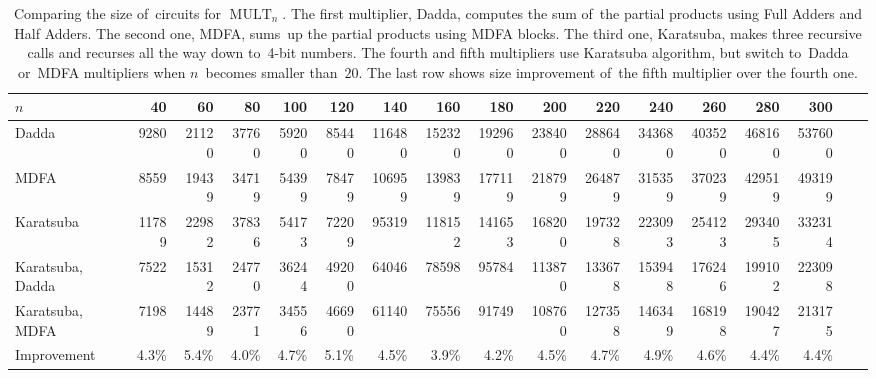 \documentclass[sigconf, review, anonymous]{acmart}
\DeclareMathOperator{\MULT}{MULT}
\begin{document}
\begin{table}
	\begin{center}
		\small
		\begin{tabular}{lrrrrrrrrrrrrrrrr}
\toprule
$n$ & 40 & 60 & 80 & 100 & 120 & 140 & 160 & 180 & 200 & 220 & 240 & 260 & 280 & 300 \\
\midrule
Dadda & 9280 & 21120 & 37760 & 59200 & 85440 & 116480 & 152320 & 192960 & 238400 & 288640 & 343680 & 403520 & 468160 & 537600 \\
MDFA & 8559 & 19439 & 34719 & 54399 & 78479 & 106959 & 139839 & 177119 & 218799 & 264879 & 315359 & 370239 & 429519 & 493199 \\
Karatsuba & 11789 & 22982 & 37836 & 54173 & 72209 & 95319 & 118152 & 141653 & 168200 & 197328 & 223093 & 254123 & 293405 & 332314 \\
Karatsuba, Dadda& 7522 & 15312 & 24770 & 36244 & 49200 & 64046 & 78598 & 95784 & 113870 & 133678 & 153948 & 176246 & 199102 & 223098 \\
Karatsuba, MDFA& 7198 & 14489 & 23771 & 34556 & 46690 & 61140 & 75556 & 91749 & 108760 & 127358 & 146349 & 168198 & 190427 & 213175 \\
Improvement  & 4.3\%  & 5.4\%  & 4.0\%  & 4.7\%  & 5.1\%  & 4.5\%  & 3.9\%  & 4.2\%  & 4.5\%  & 4.7\%  & 4.9\%  & 4.6\%  & 4.4\%  & 4.4\%\\ \bottomrule
		\end{tabular}
	\end{center}
	\caption{Comparing the size of~circuits for $\MULT_n$. The first multiplier, Dadda, computes the sum of~the partial products using Full Adders and Half Adders. The second one, MDFA, sums~up the partial products using MDFA blocks.
	The third one, Karatsuba, makes three recursive calls and recurses all the way down to~4-bit numbers. The fourth and fifth multipliers use Karatsuba algorithm, but switch to~Dadda or~MDFA multipliers when $n$~becomes smaller than~$20$. The last row shows size improvement of~the fifth multiplier over the fourth one.}
	\label{table:multiplication}
\end{table}

\end{document}
